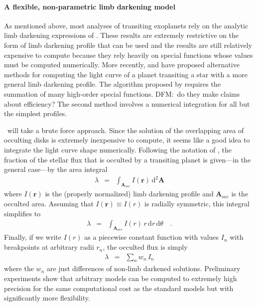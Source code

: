 \documentclass[letterpaper,12pt,preprint]{hack_aastex}
\newcommand{\Bart}{\package{Bart}}
\newcommand{\dd}{\,\mathrm{d}}
\newcommand{\bvec}[1]{\mathbf{#1}}
\begin{document}
\paragraph{A flexible, non-parametric limb darkening model}
As mentioned above, most analyses of transiting exoplanets rely on the
analytic limb darkening expressions of \citet{mandel}.
These results are extremely restrictive on the form of limb darkening profile
that can be used and the results are still relatively expensive to compute
because they rely heavily on special functions whose values must be computed
numerically.
More recently, \citet{crazyass1} and \citet{crazyass2} have proposed
alternative methods for computing the light curve of a planet transiting a
star with a more general limb darkening profile.
The algorithm proposed by \citet{crazyass1} requires the summation of many
high-order special functions.
DFM:\ do they make claims about efficiency?
The second method \citep{crazyass2} involves a numerical integration for
all but the simplest profiles.

\Bart\ will take a brute force approach.
Since the solution of the overlapping area of occulting disks is extremely
inexpensive to compute, it seems like a good idea to integrate the light curve
shape numerically.
Following the notation of \citet{mandel}, the fraction of the stellar flux
that is occulted by a transiting planet is given---in the general case---by
the area integral
\begin{eqnarray}
\lambda & = & \int_{\bvec{A}_\mathrm{occ}} I(\bvec{r}) \dd^2 \bvec{A}
\end{eqnarray}
where $I(\bvec{r})$ is the (properly normalized) limb darkening profile and
$\bvec{A}_\mathrm{occ}$ is the occulted area.
Assuming that $I(\bvec{r}) \equiv I(r)$ is radially symmetric, this integral
simplifies to
\begin{eqnarray}
\lambda & = & \int_{\bvec{A}_\mathrm{occ}} I(r) \, r \dd r \dd \theta \quad.
\end{eqnarray}
Finally, if we write $I(r)$ as a piecewise constant function with values $I_n$
with breakpoints at arbitrary radii $r_n$, the occulted flux is simply
\begin{eqnarray}
\lambda & = & \sum_n w_n \, I_n
\end{eqnarray}
where the $w_n$ are just differences of non-limb darkened solutions.
Preliminary experiments show that arbitrary models can be computed to
extremely high precision for the same computational cost as the standard
\citet{mandel} models but with significantly more flexibility.
\end{document}
